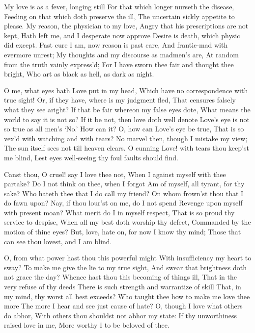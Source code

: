 \documentclass[twocolumn]{book}
\begin{document}
My love is as a fever, longing still
For that which longer nurseth the disease,
Feeding on that which doth preserve the ill,
The uncertain sickly appetite to please.
My reason, the physician to my love,
Angry that his prescriptions are not kept,
Hath left me, and I desperate now approve
Desire is death, which physic did except.
Past cure I am, now reason is past care,
And frantic-mad with evermore unrest;
My thoughts and my discourse as madmen's are,
At random from the truth vainly express'd;
  For I have sworn thee fair and thought thee bright,
  Who art as black as hell, as dark as night.


O me, what eyes hath Love put in my head,
Which have no correspondence with true sight!
Or, if they have, where is my judgment fled,
That censures falsely what they see aright?
If that be fair whereon my false eyes dote,
What means the world to say it is not so?
If it be not, then love doth well denote
Love's eye is not so true as all men's `No.'
How can it? O, how can Love's eye be true,
That is so vex'd with watching and with tears?
No marvel then, though I mistake my view;
The sun itself sees not till heaven clears.
  O cunning Love! with tears thou keep'st me blind,
  Lest eyes well-seeing thy foul faults should find.


Canst thou, O cruel! say I love thee not,
When I against myself with thee partake?
Do I not think on thee, when I forgot
Am of myself, all tyrant, for thy sake?
Who hateth thee that I do call my friend?
On whom frown'st thou that I do fawn upon?
Nay, if thou lour'st on me, do I not spend
Revenge upon myself with present moan?
What merit do I in myself respect,
That is so proud thy service to despise,
When all my best doth worship thy defect,
Commanded by the motion of thine eyes?
  But, love, hate on, for now I know thy mind;
  Those that can see thou lovest, and I am blind.


O, from what power hast thou this powerful might
With insufficiency my heart to sway?
To make me give the lie to my true sight,
And swear that brightness doth not grace the day?
Whence hast thou this becoming of things ill,
That in the very refuse of thy deeds
There is such strength and warrantize of skill
That, in my mind, thy worst all best exceeds?
Who taught thee how to make me love thee more
\numerus*{}The more I hear and see just cause of hate?
O, though I love what others do abhor,
With others thou shouldst not abhor my state:
  If thy unworthiness raised love in me,
  More worthy I to be beloved of thee.
\end{document}
